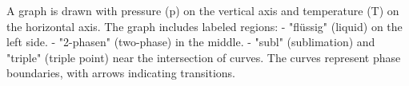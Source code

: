 A graph is drawn with pressure (p) on the vertical axis and temperature (T) on the horizontal axis. The graph includes labeled regions:  
- "flüssig" (liquid) on the left side.  
- "2-phasen" (two-phase) in the middle.  
- "subl" (sublimation) and "triple" (triple point) near the intersection of curves.  
The curves represent phase boundaries, with arrows indicating transitions.